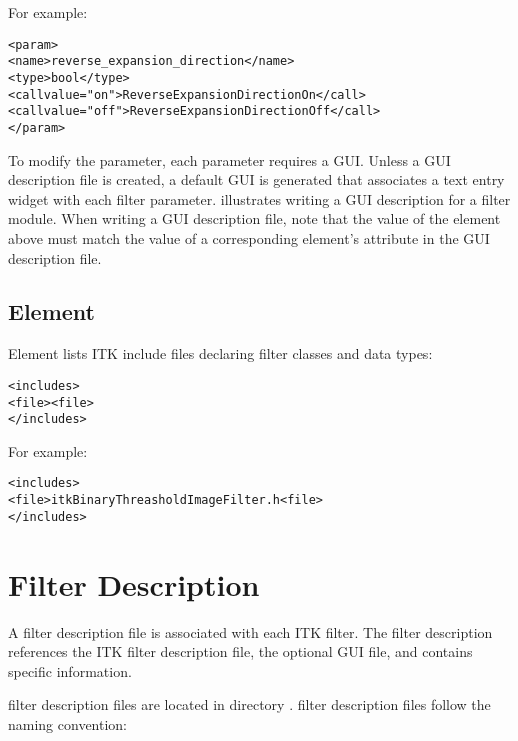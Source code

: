 For example:

\begin{alltt}
  <param>
    <name>reverse\_expansion\_direction</name>
    <type>bool</type>
    <call value="on">ReverseExpansionDirectionOn</call>
    <call value="off">ReverseExpansionDirectionOff</call>
  </param>
\end{alltt}


To modify the parameter, each parameter requires a GUI. Unless a GUI
description file is created, a default GUI is generated that
associates a text entry widget with each filter parameter.
 illustrates 
writing a GUI description for a filter module.  When writing a GUI
description file, note that the value of the 
element above must match the value of a corresponding
 element's  attribute in the GUI
description file.

\subsection{Element }
\label{sec:itk_mods:includes_element}

Element  lists ITK include files declaring filter
classes and data types:

\begin{alltt}
<includes>
  <file><file>
</includes>
\end{alltt}

For example:

\begin{alltt}
<includes>
  <file>itkBinaryThreasholdImageFilter.h<file>
</includes>
\end{alltt}


\section{\sr{} Filter Description}
\label{sec:itk_mods:sr_filter_desc}

A \sr{} filter description file is associated with each ITK filter.
The \sr{} filter description references the ITK filter description
file, the optional GUI file, and contains \sr{} specific information.

\sr{} filter description files are located in directory
.
\sr{} filter description files follow the naming convention:

